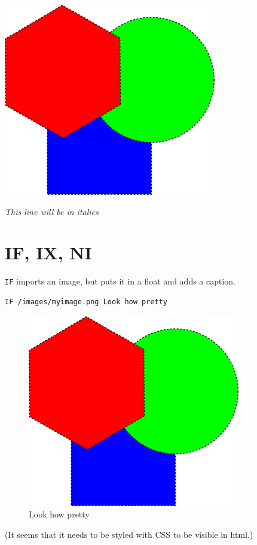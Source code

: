 \documentclass{report}
\begin{document}
\includegraphics{images/myimage.png}

\emph{This line will be in italics}

\section{IF, IX, NI}
\label{if-ix-ni}

\texttt{IF} imports an image, but puts it in a float and adds a caption.

\begin{verbatim}
IF /images/myimage.png Look how pretty
\end{verbatim}

\begin{figure}[h!]\includegraphics{images/myimage.png}\captionsetup{labelformat=empty}\caption{Look how pretty}\label{fig:look-how-pretty}\end{figure}

(It seems that it needs to be styled with CSS to be visible in html.)
\end{document}
